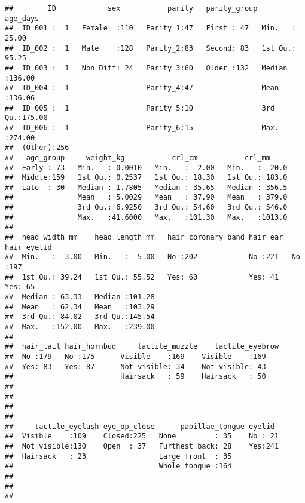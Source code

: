 \documentclass[
]{article}
\begin{document}
\begin{verbatim}
##        ID            sex           parity   parity_group    age_days     
##  ID_001 :  1   Female  :110   Parity_1:47   First : 47   Min.   : 25.00  
##  ID_002 :  1   Male    :128   Parity_2:83   Second: 83   1st Qu.: 95.25  
##  ID_003 :  1   Non Diff: 24   Parity_3:60   Older :132   Median :136.00  
##  ID_004 :  1                  Parity_4:47                Mean   :136.06  
##  ID_005 :  1                  Parity_5:10                3rd Qu.:175.00  
##  ID_006 :  1                  Parity_6:15                Max.   :274.00  
##  (Other):256                                                             
##   age_group     weight_kg           crl_cm           crl_mm      
##  Early : 73   Min.   : 0.0010   Min.   :  2.00   Min.   :  20.0  
##  Middle:159   1st Qu.: 0.2537   1st Qu.: 18.30   1st Qu.: 183.0  
##  Late  : 30   Median : 1.7805   Median : 35.65   Median : 356.5  
##               Mean   : 5.0029   Mean   : 37.90   Mean   : 379.0  
##               3rd Qu.: 6.9250   3rd Qu.: 54.60   3rd Qu.: 546.0  
##               Max.   :41.6000   Max.   :101.30   Max.   :1013.0  
##                                                                  
##  head_width_mm    head_length_mm   hair_coronary_band hair_ear  hair_eyelid
##  Min.   :  3.00   Min.   :  5.00   No :202            No :221   No :197    
##  1st Qu.: 39.24   1st Qu.: 55.52   Yes: 60            Yes: 41   Yes: 65    
##  Median : 63.33   Median :101.28                                           
##  Mean   : 62.34   Mean   :103.29                                           
##  3rd Qu.: 84.02   3rd Qu.:145.54                                           
##  Max.   :152.00   Max.   :239.00                                           
##                                                                            
##  hair_tail hair_hornbud     tactile_muzzle    tactile_eyebrow
##  No :179   No :175      Visible    :169    Visible    :169   
##  Yes: 83   Yes: 87      Not visible: 34    Not visible: 43   
##                         Hairsack   : 59    Hairsack   : 50   
##                                                              
##                                                              
##                                                              
##                                                              
##     tactile_eyelash eye_op_close      papillae_tongue eyelid   
##  Visible    :109    Closed:225   None         : 35    No : 21  
##  Not visible:130    Open  : 37   Furthest back: 28    Yes:241  
##  Hairsack   : 23                 Large front  : 35             
##                                  Whole tongue :164             
##                                                                
##                                                                
## 
\end{verbatim}
\end{document}
